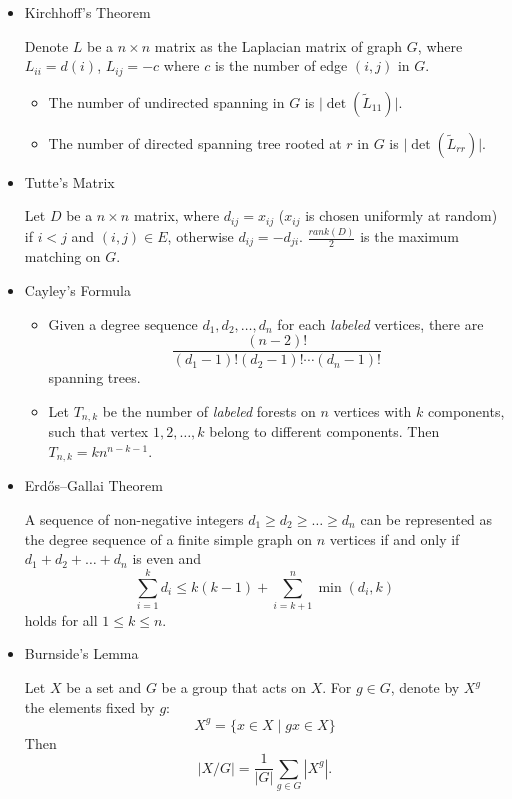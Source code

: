 
\begin{itemize}
    \item Kirchhoff's Theorem
    
    Denote $L$ be a $n \times n$ matrix as the Laplacian matrix of graph $G$, where $L_{ii} = d(i)$, $L_{ij} = -c$ where $c$ is the number of edge $(i, j)$ in $G$.
    \begin{itemize}
        \item The number of undirected spanning in $G$ is $\lvert \det(\tilde{L}_{11}) \rvert$.
        \item The number of directed spanning tree rooted at $r$ in $G$ is $\lvert \det(\tilde{L}_{rr}) \rvert$.
    \end{itemize}
    
    \item Tutte's Matrix
    
    Let $D$ be a $n \times n$ matrix, where $d_{ij} = x_{ij}$ ($x_{ij}$ is chosen uniformly at random) if $i < j$ and $(i, j) \in E$, otherwise $d_{ij} = -d_{ji}$. $\frac{rank(D)}{2}$ is the maximum matching on $G$.
    
    \item Cayley's Formula
    
    \begin{itemize}
      \item Given a degree sequence $d_1, d_2, \ldots, d_n$ for each \textit{labeled} vertices, there are $$\frac{(n - 2)!}{(d_1 - 1)!(d_2 - 1)!\cdots(d_n - 1)!}$$ spanning trees.
      \item Let $T_{n, k}$ be the number of \textit{labeled} forests on $n$ vertices with $k$ components, such that vertex $1, 2, \ldots, k$ belong to different components. Then $T_{n, k} = kn^{n - k - 1}$.
    \end{itemize}
    
    \item Erdős–Gallai Theorem
    
    A sequence of non-negative integers $d_1 \geq d_2 \geq \ldots \geq d_n$ can be represented as the degree sequence of a finite simple graph on $n$ vertices if and only if $d_1 + d_2 + \ldots + d_n$ is even and
    $$ \sum_{i = 1}^{k}d_i \leq k(k - 1) + \sum_{i = k + 1}^{n}\min(d_i, k) $$
    holds for all $1 \leq k \leq n$.
    
    \item Burnside's Lemma
    
    Let $X$ be a set and $G$ be a group that acts on $X$.
    For $g \in G$, denote by $X^g$ the elements fixed by $g$:
    \[
    X^g = \{ x \in X \mid gx \in X \}
    \]
    Then
    \[
    |X/G| = \frac{1}{|G|} \sum_{g \in G} |X^g|.
    \]
    

\end{itemize}
